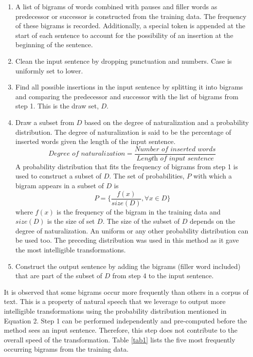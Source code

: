 \documentclass[journal]{IEEEtran}
\begin{document}
\begin{enumerate}
    \item A list of bigrams of words combined with pauses and filler words as predecessor or successor is constructed from the training data. The frequency of these bigrams is recorded. Additionally, a special token is appended at the start of each sentence to account for the possibility of an insertion at the beginning of the sentence.
    \item Clean the input sentence by dropping punctuation and numbers. Case is uniformly set to lower. 
    \item Find all possible insertions in the input sentence by splitting it into bigrams and comparing the predecessor and successor with the list of bigrams from step 1. This is the draw set, $D$.
    \item Draw a subset from $D$ based on the degree of naturalization and a probability distribution. The degree of naturalization is said to be the percentage of inserted words given the length of the input sentence.
    \begin{equation}
        \textit{Degree of naturalization} = \frac{\textit{Number of inserted words}}{\textit{Length of input sentence}}
    \end{equation}
    A probability distribution that fits the frequency of bigrams from step 1 is used to construct a subset of $D$. The set of probabilities, $P$ with which a bigram appears in a subset of $D$ is 
    \begin{equation}
        P = \{\frac{f(x)}{size(D)}, \forall x \in D\}
    \end{equation}
    where $f(x)$ is the frequency of the bigram in the training data and $size(D)$ is the size of set $D$. The size of the subset of $D$ depends on the degree of naturalization.
    An uniform or any other probability distribution can be used too. The preceding distribution was used in this method as it gave the most intelligible transformations.  
    \item Construct the output sentence by adding the bigrams (filler word included) that are part of the subset of $D$ from step 4 to the input sentence.
\end{enumerate}

It is observed that some bigrams occur more frequently than others in a corpus of text. This is a property of natural speech that we leverage to output more intelligible transformations using the probability distribution mentioned in Equation 2. Step 1 can be performed independently and pre-computed before the method sees an input sentence. Therefore, this step does not contribute to the overall speed of the transformation. Table \ref{tab1} lists the five most frequently occurring bigrams from the training data.
\end{document}
